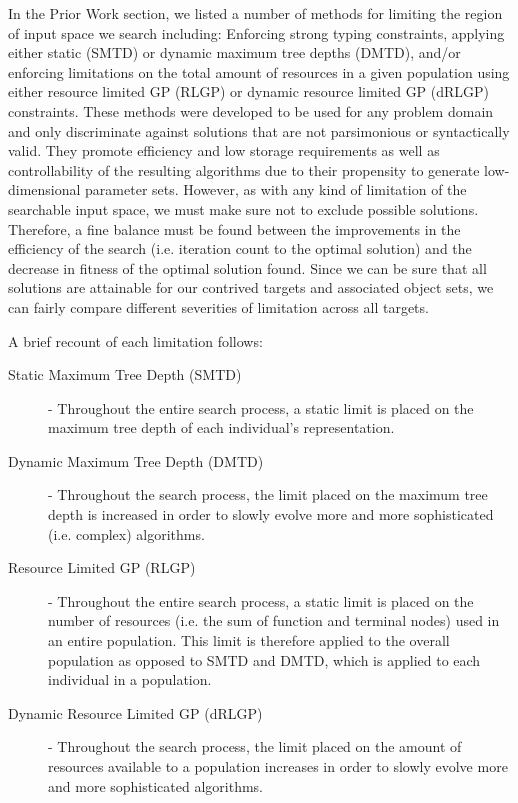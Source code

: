 \documentclass[a4paper,12pt]{report} 	%
\numberwithin{figure}{chapter}
\numberwithin{table}{chapter}
\numberwithin{equation}{chapter}
\begin{document}
\begin{flushleft}
In the Prior Work section, we listed a number of methods for limiting the region of input space we search including: Enforcing strong typing constraints, applying either static (SMTD) or dynamic maximum tree depths (DMTD), and/or enforcing limitations on the total amount of resources in a given population using either resource limited GP (RLGP) or dynamic resource limited GP (dRLGP) constraints. These methods were developed to be used for any problem domain and only discriminate against solutions that are not parsimonious or syntactically valid. They promote efficiency and low storage requirements as well as controllability of the resulting algorithms due to their propensity to generate low-dimensional parameter sets. However, as with any kind of limitation of the searchable input space, we must make sure not to exclude possible solutions. Therefore, a fine balance must be found between the improvements in the efficiency of the search (i.e. iteration count to the optimal solution) and the decrease in fitness of the optimal solution found. Since we can be sure that all solutions are attainable for our contrived targets and associated object sets, we can fairly compare different severities of limitation across all targets.

A brief recount of each limitation follows:

\begin{description}
\item [Static Maximum Tree Depth (SMTD)] - Throughout the entire search process, a static limit is placed on the maximum tree depth of each individual's representation.
\item [Dynamic Maximum Tree Depth (DMTD)] - Throughout the search process, the limit placed on the maximum tree depth is increased in order to slowly evolve more and more sophisticated (i.e. complex) algorithms.
\item [Resource Limited GP (RLGP)] - Throughout the entire search process, a static limit is placed on the number of resources (i.e. the sum of function and terminal nodes) used in an entire population. This limit is therefore applied to the overall population as opposed to SMTD and DMTD, which is applied to each individual in a population.
\item [Dynamic Resource Limited GP (dRLGP)] - Throughout the search process, the limit placed on the amount of resources available to a population increases in order to slowly evolve more and more sophisticated algorithms.
\end{description}


\end{flushleft}
\end{document}
